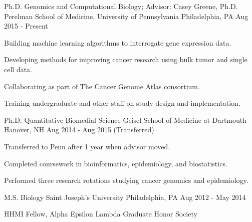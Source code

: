 
\begin{cventries}

  \cventry
    {Ph.D. Genomics and Computational Biology; Advisor: Casey Greene, Ph.D.}
    {Perelman School of Medicine, University of Pennsylvania} %
    {Philadelphia, PA} %
    {Aug 2015 - Present} %
    {
      \begin{cvitems} %
        \item{Building machine learning algorithms to interrogate gene
              expression data.}
        \item{Developing methods for improving cancer research using bulk tumor
              and single cell data.}
        \item{Collaborating as part of The Cancer Genome Atlas consortium}.
        \item{Training undergraduate and other staff on study design and
              implementation.}
      \end{cvitems}
    }

  \cventry
    {Ph.D. Quantitative Biomedial Science} %
    {Geisel School of Medicine at Dartmouth} %
    {Hanover, NH} %
    {Aug 2014 - Aug 2015 (Transferred)} %
    {
      \begin{cvitems} %
        \item{Transferred to Penn after 1 year when advisor moved.}
        \item{Completed coursework in bioinformatics, epidemiology, and
              biostatistics.}
        \item{Performed three research rotations studying cancer genomics and
              epidemiology.}
      \end{cvitems}
    }

  \cventry
    {M.S. Biology} %
    {Saint Joseph's University} %
    {Philadelphia, PA} %
    {Aug 2012 - May 2014} %
    {
      \begin{cvitems} %
        \item{HHMI Fellow, Alpha Epsilon Lambda Graduate Honor Society}
      \end{cvitems}
    }


\end{cventries}
